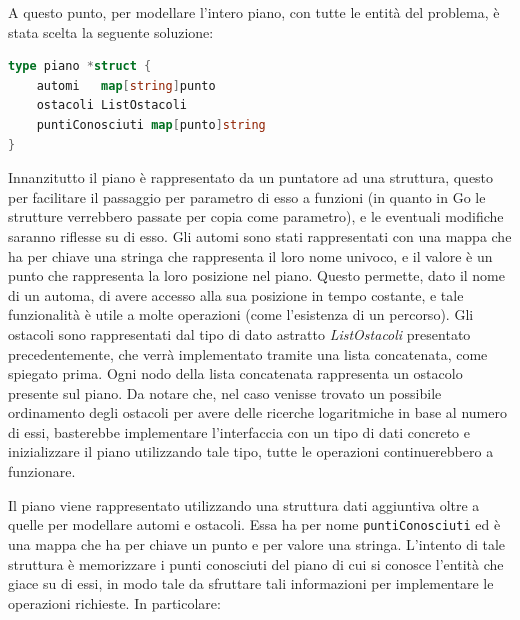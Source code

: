 \documentclass[a4paper,11pt]{article}
\begin{document}
A questo punto, per modellare l'intero piano, con tutte le entità del problema, è stata scelta la seguente soluzione:

\begin{lstlisting}[language=Go]
type piano *struct {
	automi   map[string]punto
	ostacoli ListOstacoli
	puntiConosciuti map[punto]string
}
\end{lstlisting}

Innanzitutto il piano è rappresentato da un puntatore ad una struttura, questo per facilitare il passaggio per parametro di esso a funzioni (in quanto in Go le strutture verrebbero passate per copia come parametro), e le eventuali modifiche saranno riflesse su di esso. Gli automi sono stati rappresentati con una mappa che ha per chiave una stringa che rappresenta il loro nome univoco, e il valore è un punto che rappresenta la loro posizione nel piano. Questo permette, dato il nome di un automa, di avere accesso alla sua posizione in tempo costante, e tale funzionalità è utile a molte operazioni (come l'esistenza di un percorso). Gli ostacoli sono rappresentati dal tipo di dato astratto \textit{ListOstacoli} presentato precedentemente, che verrà implementato tramite una lista concatenata, come spiegato prima. Ogni nodo della lista concatenata rappresenta un ostacolo presente sul piano. Da notare che, nel caso venisse trovato un possibile ordinamento degli ostacoli per avere delle ricerche logaritmiche in base al numero di essi, basterebbe implementare l'interfaccia con un tipo di dati concreto e inizializzare il piano utilizzando tale tipo, tutte le operazioni continuerebbero a funzionare. 

Il piano viene rappresentato utilizzando una struttura dati aggiuntiva oltre a quelle per modellare automi e ostacoli. Essa ha per nome \texttt{puntiConosciuti} ed è una mappa che ha per chiave un punto e per valore una stringa. L'intento di tale struttura è memorizzare i punti conosciuti del piano di cui si conosce l'entità che giace su di essi, in modo tale da sfruttare tali informazioni per implementare le operazioni richieste. In particolare:
\end{document}
